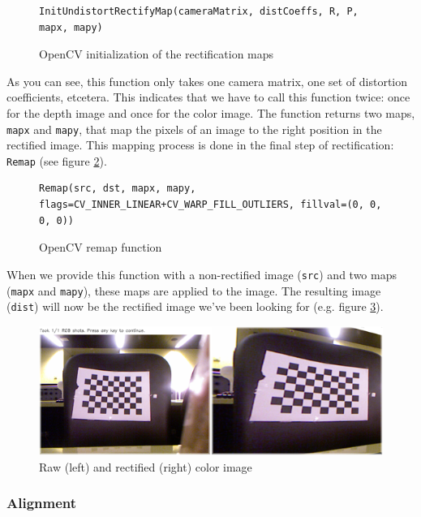 \begin{figure}[H]
\begin{lstlisting}
InitUndistortRectifyMap(cameraMatrix, distCoeffs, R, P, mapx, mapy)
\end{lstlisting}
\caption{OpenCV initialization of the rectification maps}
\label{code:initrecmap}
\end{figure}

As you can see, this function only takes one camera matrix, one set of distortion coefficients, etcetera. This indicates that we have to call this function twice: once for the depth image and once for the color image. The function returns two maps, \verb|mapx| and \verb|mapy|, that map the pixels of an image to the right position in the rectified image. This mapping process is done in the final step of rectification: \verb|Remap| (see figure \ref{code:remap}).

\begin{figure}[H]
\begin{lstlisting}
Remap(src, dst, mapx, mapy, flags=CV_INNER_LINEAR+CV_WARP_FILL_OUTLIERS, fillval=(0, 0, 0, 0)) 
\end{lstlisting}
\caption{OpenCV remap function}
\label{code:remap}
\end{figure}

When we provide this function with a non-rectified image (\verb|src|) and two maps (\verb|mapx| and \verb|mapy|), these maps are applied to the image. The resulting image (\verb|dist|) will now be the rectified image we've been looking for (e.g. figure \ref{fig:rectify}).

\begin{figure}[H]
\centering
\includegraphics[scale=0.6]{images/rectify.png}
\caption{Raw (left) and rectified (right) color image}
\label{fig:rectify}
\end{figure}


\subsubsection{Alignment}
\label{sec:alignment}

